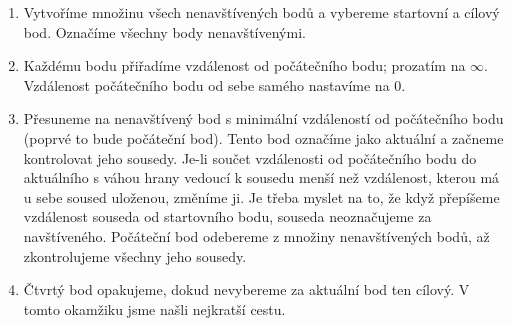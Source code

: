 \begin{enumerate}
    \item Vytvoříme množinu všech nenavštívených bodů a vybereme startovní a cílový bod. Označíme všechny body nenavštívenými. 
    \item Každému bodu přiřadíme vzdálenost od počátečního bodu; prozatím na $\infty$. Vzdálenost počátečního bodu od sebe samého nastavíme na $0$. 
    \item Přesuneme na nenavštívený bod s minimální vzdáleností od počátečního bodu (poprvé to bude počáteční bod). 
    Tento bod označíme jako aktuální a začneme kontrolovat jeho sousedy. 
    Je-li součet vzdálenosti od počátečního bodu do aktuálního s váhou hrany vedoucí k sousedu menší než vzdálenost, kterou má u sebe soused uloženou, změníme ji.
    Je třeba myslet na to, že když přepíšeme vzdálenost souseda od startovního bodu, souseda neoznačujeme za navštíveného. Počáteční bod odebereme z množiny nenavštívených bodů, až zkontrolujeme všechny jeho sousedy.
    \item Čtvrtý bod opakujeme, dokud nevybereme za aktuální bod ten cílový. V tomto okamžiku jsme našli nejkratší cestu.
\end{enumerate}